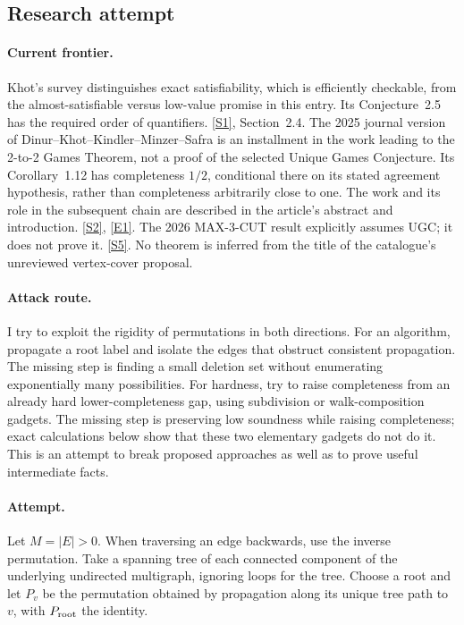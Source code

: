 \documentclass[11pt,a4paper]{article}
\newcommand{\sref}[2]{\hyperlink{source:#1:#2}{[S#2]}}
\newcommand{\eref}[2]{\hyperlink{extra:#1:#2}{[E#2]}}
\numberwithin{equation}{section}
\begin{document}
\subsection{Research attempt}

\paragraph{Current frontier.}
Khot's survey distinguishes exact satisfiability, which is efficiently
checkable, from the almost-satisfiable versus low-value promise in this
entry. Its Conjecture~2.5 has the required order of quantifiers.
\sref{statement}{1}, Section~2.4. The 2025 journal version of
Dinur--Khot--Kindler--Minzer--Safra is an installment in the work leading
to the 2-to-2 Games Theorem, not a proof of the selected Unique Games
Conjecture. Its Corollary~1.12 has completeness $1/2$, conditional there
on its stated agreement hypothesis, rather than completeness arbitrarily
close to one. The work and its role in the subsequent chain are described
in the article's abstract and introduction. \sref{statement}{2}, \eref{statement}{1}.
The 2026 MAX-3-CUT result explicitly assumes UGC; it does not prove it.
\sref{statement}{5}. No theorem is inferred from the title of the catalogue's
unreviewed vertex-cover proposal.

\paragraph{Attack route.}
I try to exploit the rigidity of permutations in both directions. For an
algorithm, propagate a root label and isolate the edges that obstruct
consistent propagation. The missing step is finding a small deletion set
without enumerating exponentially many possibilities. For hardness, try
to raise completeness from an already hard lower-completeness gap, using
subdivision or walk-composition gadgets. The missing step is preserving
low soundness while raising completeness; exact calculations below show
that these two elementary gadgets do not do it. This is an attempt to
break proposed approaches as well as to prove useful intermediate facts.

\paragraph{Attempt.}
Let $M=|E|>0$. When traversing an edge backwards, use the inverse
permutation. Take a spanning tree of each connected component of the
underlying undirected multigraph, ignoring loops for the tree. Choose a
root and let $P_v$ be the permutation obtained by propagation along its
unique tree path to $v$, with $P_{\rm root}$ the identity.
\end{document}
